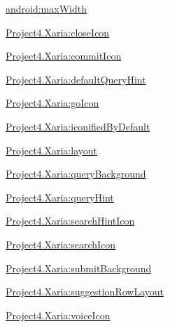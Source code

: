 {\ttfamily \hyperlink{classproject4_1_1xaria_1_1R_1_1styleable_a3639cb45230c4e71f0cc02947e9eda85}{android\+:max\+Width}}

{\ttfamily \hyperlink{classproject4_1_1xaria_1_1R_1_1styleable_a5a61b07ff3f067c74cabaac20104da1b}{Project4.\+Xaria\+:close\+Icon}}

{\ttfamily \hyperlink{classproject4_1_1xaria_1_1R_1_1styleable_a63519a27d7991d2eae6ff9cf06953242}{Project4.\+Xaria\+:commit\+Icon}}

{\ttfamily \hyperlink{classproject4_1_1xaria_1_1R_1_1styleable_a2e66e2926f9bd975328f388c70fde340}{Project4.\+Xaria\+:default\+Query\+Hint}}

{\ttfamily \hyperlink{classproject4_1_1xaria_1_1R_1_1styleable_a722e570aa508bd7cec45f03da9ac5f29}{Project4.\+Xaria\+:go\+Icon}}

{\ttfamily \hyperlink{classproject4_1_1xaria_1_1R_1_1styleable_a4ef3397cc9442515802ffefa9ec8123e}{Project4.\+Xaria\+:iconified\+By\+Default}}

{\ttfamily \hyperlink{classproject4_1_1xaria_1_1R_1_1styleable_a3779c51813ae088ff27ef4c0c40ba410}{Project4.\+Xaria\+:layout}}

{\ttfamily \hyperlink{classproject4_1_1xaria_1_1R_1_1styleable_a56c5e64109ae3a3635dabc3c9c16287c}{Project4.\+Xaria\+:query\+Background}}

{\ttfamily \hyperlink{classproject4_1_1xaria_1_1R_1_1styleable_a7d9e5ac551e8a001fcbe2c8b814a3573}{Project4.\+Xaria\+:query\+Hint}}

{\ttfamily \hyperlink{classproject4_1_1xaria_1_1R_1_1styleable_a7091bc68f8b0059447de84bf2a752de5}{Project4.\+Xaria\+:search\+Hint\+Icon}}

{\ttfamily \hyperlink{classproject4_1_1xaria_1_1R_1_1styleable_a755d82e19c508ecb70f34634e682bb28}{Project4.\+Xaria\+:search\+Icon}}

{\ttfamily \hyperlink{classproject4_1_1xaria_1_1R_1_1styleable_a0f597ce0d22c799517c8d6d3e194a1c0}{Project4.\+Xaria\+:submit\+Background}}

{\ttfamily \hyperlink{classproject4_1_1xaria_1_1R_1_1styleable_ac24e80493308e5cd30e2dfffff0bec9d}{Project4.\+Xaria\+:suggestion\+Row\+Layout}}

{\ttfamily \hyperlink{classproject4_1_1xaria_1_1R_1_1styleable_a4e40fdd0fa9bcc88e6f7800e6542d8ce}{Project4.\+Xaria\+:voice\+Icon}}

